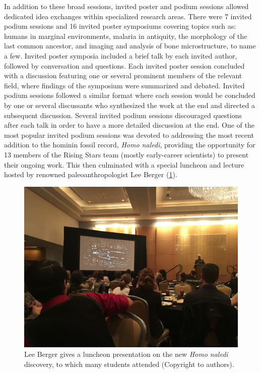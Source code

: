 \documentclass[english]{ijsra}
\begin{document}
In addition to these broad sessions, 
invited poster and podium sessions allowed dedicated idea exchanges within specialized research areas. 
There were 7 invited podium sessions and 16 invited poster symposiums covering topics such as: humans in marginal environments, 
malaria in antiquity, the morphology of the last common ancestor, and imaging and analysis of bone microstructure, to name a few. 
Invited poster symposia included a brief talk by each invited author, followed by conversation and questions. 
Each invited poster session concluded with a discussion featuring one or several prominent members of the relevant field,
where findings of the symposium were summarized and debated. 
Invited podium sessions followed a similar format where each session would be concluded by one or several discussants who synthesized
the work at the end and directed a subsequent discussion. 
Several invited podium sessions discouraged questions after each talk in order to have a more detailed discussion at the end.
One of the most popular invited podium sessions was devoted to addressing the most recent addition to the hominin fossil record,
\emph{Homo naledi}, providing the opportunity for 13 members of the Rising Stars team (mostly early-career scientists)
to present their ongoing work. 
This then culminated with a special luncheon and lecture hosted by renowned paleoanthropologist Lee Berger (\cref{fig:Ward-Figure7}).

	\begin{figure} %
		\includegraphics[width=\linewidth]{figures/Ward-Figure7}
		\caption{Lee Berger gives a luncheon presentation on the new \emph{Homo naledi} discovery, to which many students attended (Copyright to authors).}
		\centering
		\label{fig:Ward-Figure7}
	\end{figure}
\end{document}
